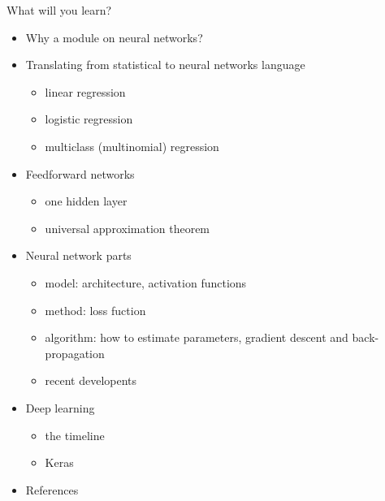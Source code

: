 \documentclass[10pt,ignorenonframetext,]{beamer}
\providecommand{\tightlist}{%
  \setlength{\itemsep}{0pt}\setlength{\parskip}{0pt}}
\begin{document}
\begin{frame}

\begin{block}{What will you learn?}

\begin{itemize}
\tightlist
\item
  Why a module on neural networks?
\item
  Translating from statistical to neural networks language

  \begin{itemize}
  \tightlist
  \item
    linear regression
  \item
    logistic regression
  \item
    multiclass (multinomial) regression
  \end{itemize}
\item
  Feedforward networks

  \begin{itemize}
  \tightlist
  \item
    one hidden layer
  \item
    universal approximation theorem
  \end{itemize}
\end{itemize}

\end{block}

\end{frame}

\begin{frame}

\begin{itemize}
\tightlist
\item
  Neural network parts

  \begin{itemize}
  \tightlist
  \item
    model: architecture, activation functions
  \item
    method: loss fuction
  \item
    algorithm: how to estimate parameters, gradient descent and
    back-propagation
  \item
    recent developents
  \end{itemize}
\item
  Deep learning

  \begin{itemize}
  \tightlist
  \item
    the timeline
  \item
    Keras
  \end{itemize}
\item
  References
\end{itemize}

\end{frame}
\end{document}
